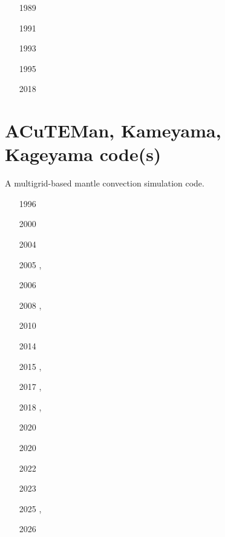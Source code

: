 \begin{small}
\begin{itemize}
\item[1989] \textcite{niba89}
\item[1991] \textcite{bass91}
\item[1993] \textcite{bakp93}
\item[1995] \textcite{bass95}
\item[2018] \textcite{zhzz18}
\end{itemize}
\end{small}

\section{ACuTEMan, Kameyama, Kageyama code(s)} 
A multigrid-based mantle convection simulation code.

\begin{small}
\begin{itemize}
\item[1996] \textcite{kafo96}
\item[2000] \textcite{kaog00}
\item[2004] \textcite{yoka04}
\item[2005] \textcite{kame05}, \textcite{kaks05}
\item[2006] \textcite{yoka06}
\item[2008] \textcite{dakk08}, \textcite{kaks08}
\item[2010] \textcite{kilv10}
\item[2014] \textcite{mitk14}
\item[2015] \textcite{miko15}, \textcite{kamo15}
\item[2017] \textcite{miko17}, \textcite{kaha17}
\item[2018] \textcite{miko18}, \textcite{kaya18}
\item[2020] \textcite{miko20} 
\item[2020] \textcite{tska20}
\item[2022] \textcite{kame22}
\item[2023] \textcite{ukog23}
\item[2025] \textcite{takm25}, \textcite{kame25}
\item[2026] \textcite{ukmy26}
\end{itemize}
\end{small}

